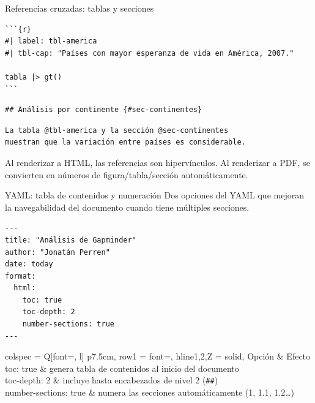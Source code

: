 \documentclass[8pt]{beamer}
\begin{document}
	\begin{frame}[fragile]{Referencias cruzadas: tablas y secciones}
\begin{lstlisting}
```{r}
#| label: tbl-america
#| tbl-cap: "Países con mayor esperanza de vida en América, 2007."

tabla |> gt()
```
\end{lstlisting}

\begin{lstlisting}
## Análisis por continente {#sec-continentes}
\end{lstlisting}

\begin{lstlisting}
La tabla @tbl-america y la sección @sec-continentes
muestran que la variación entre países es considerable.
\end{lstlisting}

		\begin{exampleblock}{}
			Al renderizar a HTML, las referencias son hipervínculos. Al renderizar a PDF, se convierten en números de figura/tabla/sección automáticamente.
		\end{exampleblock}
	\end{frame}


	\begin{frame}[fragile]{YAML: tabla de contenidos y numeración}
		Dos opciones del YAML que mejoran la navegabilidad del documento cuando tiene múltiples secciones.

\begin{lstlisting}
---
title: "Análisis de Gapminder"
author: "Jonatán Perren"
date: today
format:
  html:
    toc: true
    toc-depth: 2
    number-sections: true
---
\end{lstlisting}

		\begin{center}
			\small
			\begin{tblr}{
				colspec  = {Q[font=\ttfamily, l] p{7.5cm}},
				row{1}   = {font=\bfseries},
				hline{1,2,Z} = {solid},
			}
				Opción & Efecto\\
				toc: true & genera tabla de contenidos al inicio del documento\\
				toc-depth: 2 & incluye hasta encabezados de nivel 2 (\texttt{\#\#})\\
				number-sections: true & numera las secciones automáticamente (1, 1.1, 1.2\ldots)\\
			\end{tblr}
		\end{center}
	\end{frame}
\end{document}
